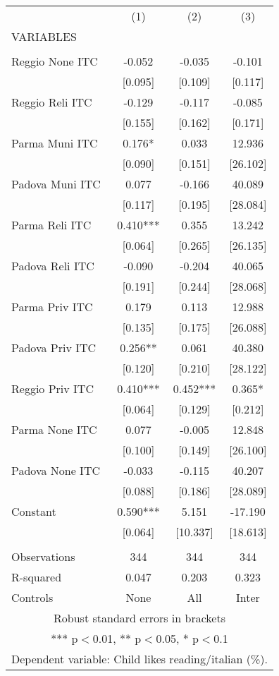 \begin{tabular}{lccc} \hline
 & (1) & (2) & (3) \\
VARIABLES &  &  &  \\ \hline
 &  &  &  \\
Reggio None ITC & -0.052 & -0.035 & -0.101 \\
 & [0.095] & [0.109] & [0.117] \\
Reggio Reli ITC & -0.129 & -0.117 & -0.085 \\
 & [0.155] & [0.162] & [0.171] \\
Parma Muni ITC & 0.176* & 0.033 & 12.936 \\
 & [0.090] & [0.151] & [26.102] \\
Padova Muni ITC & 0.077 & -0.166 & 40.089 \\
 & [0.117] & [0.195] & [28.084] \\
Parma Reli ITC & 0.410*** & 0.355 & 13.242 \\
 & [0.064] & [0.265] & [26.135] \\
Padova Reli ITC & -0.090 & -0.204 & 40.065 \\
 & [0.191] & [0.244] & [28.068] \\
Parma Priv ITC & 0.179 & 0.113 & 12.988 \\
 & [0.135] & [0.175] & [26.088] \\
Padova Priv ITC & 0.256** & 0.061 & 40.380 \\
 & [0.120] & [0.210] & [28.122] \\
Reggio Priv ITC & 0.410*** & 0.452*** & 0.365* \\
 & [0.064] & [0.129] & [0.212] \\
Parma None ITC & 0.077 & -0.005 & 12.848 \\
 & [0.100] & [0.149] & [26.100] \\
Padova None ITC & -0.033 & -0.115 & 40.207 \\
 & [0.088] & [0.186] & [28.089] \\
Constant & 0.590*** & 5.151 & -17.190 \\
 & [0.064] & [10.337] & [18.613] \\
 &  &  &  \\
Observations & 344 & 344 & 344 \\
R-squared & 0.047 & 0.203 & 0.323 \\
 Controls & None & All & Inter \\ \hline
\multicolumn{4}{c}{ Robust standard errors in brackets} \\
\multicolumn{4}{c}{ *** p$<$0.01, ** p$<$0.05, * p$<$0.1} \\
\multicolumn{4}{c}{ Dependent variable: Child likes reading/italian (\%).} \\
\end{tabular}
